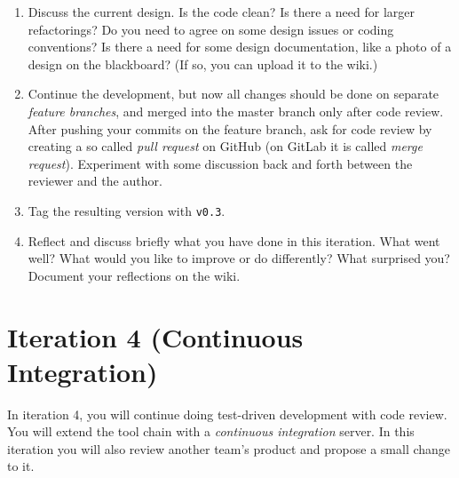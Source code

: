 \documentclass[swedish,english]{article}
\begin{document}
\begin{enumerate}
\item Discuss the current design. Is the code clean? Is there a need for larger refactorings? Do you need to agree on some design issues or coding conventions? Is there a need for some design documentation, like a photo of a design on the blackboard? (If so, you can upload it to the wiki.)
\item Continue the development, but now all changes should be done on separate \emph{feature branches}, and merged into the master branch only after code review. After pushing your commits on the feature branch, ask for code review by creating a so called \emph{pull request} on GitHub (on GitLab it is called \emph{merge request}). Experiment with some discussion back and forth between the reviewer and the author.
\item Tag the resulting version with \verb'v0.3'.
\item Reflect and discuss briefly what you have done in this iteration. What went well? What would you like to improve or do differently? What surprised you? Document your reflections on the wiki.
\end{enumerate}

\section*{Iteration 4 (Continuous Integration)}
In iteration 4, you will continue doing test-driven development with code review. You will extend the tool chain with a \emph{continuous integration} server. In this iteration you will also review another team's product and propose a small change to it.
\end{document}
